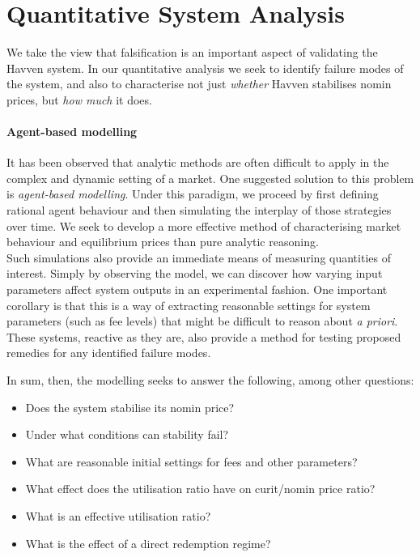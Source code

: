 \section{Quantitative System Analysis}

We take the view that falsification is an important aspect of validating
the Havven system. In our quantitative analysis we seek to identify failure modes
of the system, and also to characterise not just \textit{whether} Havven stabilises
nomin prices, but \textit{how much} it does.

\paragraph{Agent-based modelling} It has been observed that analytic methods are often difficult to
apply in the complex and dynamic setting of a market.
One suggested solution to this problem is \textit{agent-based modelling}.
Under this paradigm, we proceed by first defining rational agent behaviour
and then simulating the interplay of those strategies over time.
We seek to develop a more effective
method of characterising market behaviour and equilibrium prices than pure analytic reasoning.~\cite{poggio2001agent}\\

\noindent Such simulations also provide an immediate means of measuring
quantities of interest. Simply by observing
the model, we can discover how varying input parameters
affect system outputs in an experimental fashion.
One important corollary is that this is a way of extracting reasonable
settings for system parameters (such as fee levels) that might be difficult
to reason about \textit{a priori}. These systems, reactive as they are,
also provide a method for testing proposed remedies for any identified failure
modes.

\noindent In sum, then, the modelling seeks to answer the following, among other questions:

\begin{itemize}
    \item Does the system stabilise its nomin price?
    \item Under what conditions can stability fail?
    \item What are reasonable initial settings for fees and other parameters?
    \item What effect does the utilisation ratio have on curit/nomin price ratio?
    \item What is an effective utilisation ratio?
    \item What is the effect of a direct redemption regime?
\end{itemize}

